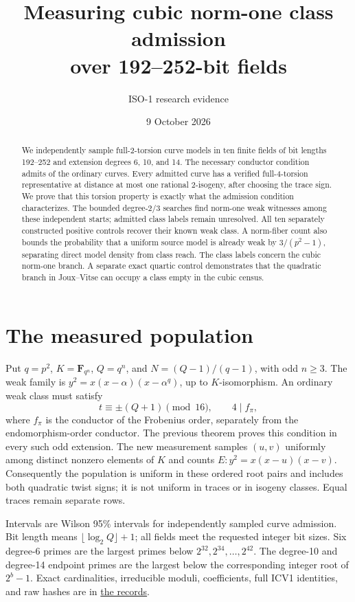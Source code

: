 \documentclass[11pt]{article}
\title{Measuring cubic norm-one class admission\\over 192--252-bit fields}
\author{ISO-1 research evidence}
\date{9 October 2026}
\newcommand{\F}{\mathbf F}
\begin{document}
\maketitle

\begin{abstract}
We independently sample \TotalCurves{} full-2-torsion curve models in ten
finite fields of bit lengths 192--252 and extension degrees 6, 10, and 14.
The necessary conductor condition admits \TotalAdmitted{} of the
\TotalOrdinary{} ordinary curves. Every admitted curve has a verified
full-4-torsion representative at distance at most one rational 2-isogeny,
after choosing the trace sign. We prove that this torsion property is exactly
what the admission condition characterizes. The bounded degree-2/3 searches
find \TotalWitnesses{} norm-one weak witnesses among these independent starts;
\TotalUnresolved{} admitted class labels remain unresolved. All ten separately
constructed positive controls recover their known weak class. A norm-fiber
count also bounds the probability that a uniform source model is already
weak by $3/(p^2-1)$, separating direct model density from class reach.
The class labels concern the cubic norm-one branch. A separate exact
quartic control demonstrates that the quadratic branch in Joux--Vitse
can occupy a class empty in the cubic census.
\end{abstract}

\section{The measured population}
Put $q=p^2$, $K=\F_{q^n}$, $Q=q^n$, and
$N=(Q-1)/(q-1)$, with odd $n\ge3$. The weak family is
$y^2=x(x-\alpha)(x-\alpha^q)$, up to $K$-isomorphism.
An ordinary weak class must satisfy
\[
 t\equiv\pm(Q+1)\pmod {16},\qquad 4\mid f_\pi,
\]
where $f_\pi$ is the conductor of the Frobenius order, separately from
the endomorphism-order conductor. The previous theorem proves this
condition in every such odd extension. The new measurement samples
$(u,v)$ uniformly among distinct nonzero elements of $K$ and counts
$E:y^2=x(x-u)(x-v)$. Consequently the population is uniform in these
ordered root pairs and includes both quadratic twist signs; it is not
uniform in traces or in isogeny classes. Equal traces remain separate rows.

\begin{center}

\end{center}
Intervals are Wilson 95\% intervals for independently sampled curve
admission. Bit length means $\lfloor\log_2 Q\rfloor+1$; all fields meet
the requested integer bit sizes. Six degree-6 primes are the largest primes
below $2^{32},2^{34},\ldots,2^{42}$. The degree-10 and degree-14 endpoint
primes are the largest below the corresponding integer root of $2^b-1$.
Exact cardinalities, irreducible moduli, coefficients, full ICV1 identities,
and raw hashes are in \href{population_run1/curve_records.json}{the records}.
\end{document}
